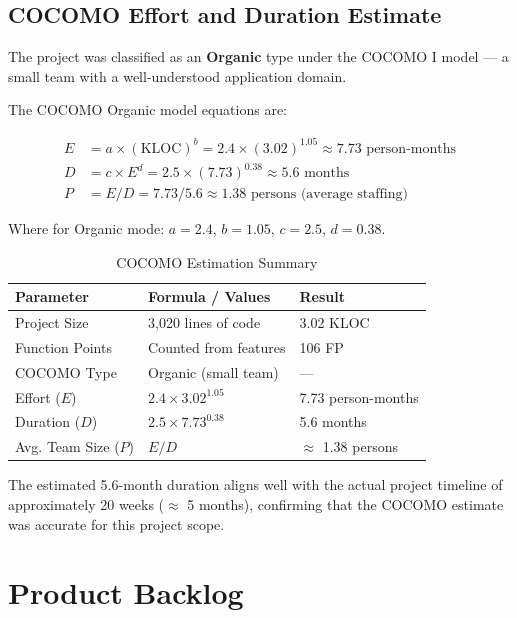 \documentclass[12pt,a4paper]{report}
\begin{document}
\subsection{COCOMO Effort and Duration Estimate}

The project was classified as an \textbf{Organic} type under the COCOMO I model --- a small team with a well-understood application domain.

The COCOMO Organic model equations are:

\begin{align}
  E  &= a \times (\text{KLOC})^b = 2.4 \times (3.02)^{1.05} \approx \mathbf{7.73} \text{ person-months} \\
  D  &= c \times E^d = 2.5 \times (7.73)^{0.38} \approx \mathbf{5.6} \text{ months} \\
  P  &= E / D = 7.73 / 5.6 \approx \mathbf{1.38} \text{ persons (average staffing)}
\end{align}

Where for Organic mode: $a = 2.4$, $b = 1.05$, $c = 2.5$, $d = 0.38$.

\begin{table}[H]
  \centering
  \caption{COCOMO Estimation Summary}
  \begin{tabular}{lll}
    \toprule
    \textbf{Parameter} & \textbf{Formula / Values} & \textbf{Result} \\
    \midrule
    Project Size        & 3,020 lines of code         & 3.02 KLOC \\
    Function Points     & Counted from features       & 106 FP \\
    COCOMO Type         & Organic (small team)        & --- \\
    Effort ($E$)        & $2.4 \times 3.02^{1.05}$   & 7.73 person-months \\
    Duration ($D$)      & $2.5 \times 7.73^{0.38}$   & 5.6 months \\
    Avg. Team Size ($P$)& $E / D$                    & $\approx$ 1.38 persons \\
    \bottomrule
  \end{tabular}
\end{table}

The estimated 5.6-month duration aligns well with the actual project timeline of approximately 20 weeks ($\approx$ 5 months), confirming that the COCOMO estimate was accurate for this project scope.

\section{Product Backlog}
\end{document}
